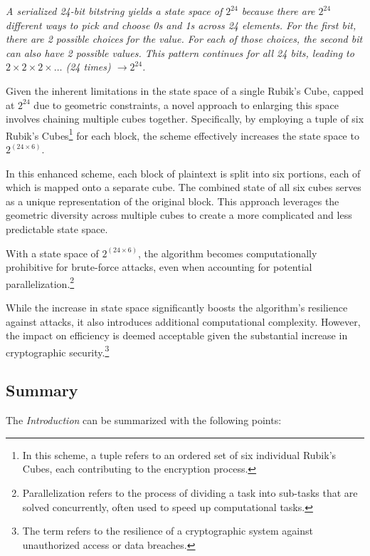 \documentclass[12pt]{article}
\begin{document}
\textit{A serialized 24-bit bitstring yields a state space of \(2^{24}\) because there are \(2^{24}\) different ways to pick and choose 0s and 1s across 24 elements. For the first bit, there are 2 possible choices for the value. For each of those choices, the second bit can also have 2 possible values. This pattern continues for all 24 bits, leading to \(2 \times 2 \times 2 \times \ldots\) (24 times) \(\rightarrow 2^{24}\).}

Given the inherent limitations in the state space of a single Rubik's Cube, capped at \(2^{24}\) due to geometric constraints, a novel approach to enlarging this space involves chaining multiple cubes together. Specifically, by employing a tuple of six Rubik's Cubes\footnote{In this scheme, a tuple refers to an ordered set of six individual Rubik's Cubes, each contributing to the encryption process.} for each block, the scheme effectively increases the state space to \(2^{(24 \times 6)}\).

In this enhanced scheme, each block of plaintext is split into six portions, each of which is mapped onto a separate cube. The combined state of all six cubes serves as a unique representation of the original block. This approach leverages the geometric diversity across multiple cubes to create a more complicated and less predictable state space.

With a state space of \(2^{(24 \times 6)}\), the algorithm becomes computationally prohibitive for brute-force attacks, even when accounting for potential parallelization.\footnote{Parallelization refers to the process of dividing a task into sub-tasks that are solved concurrently, often used to speed up computational tasks.}

While the increase in state space significantly boosts the algorithm's resilience against attacks, it also introduces additional computational complexity. However, the impact on efficiency is deemed acceptable given the substantial increase in cryptographic security.\footnote{The term refers to the resilience of a cryptographic system against unauthorized access or data breaches.}

\subsection{Summary}

The \textit{Introduction} can be summarized with the following points:
\end{document}
